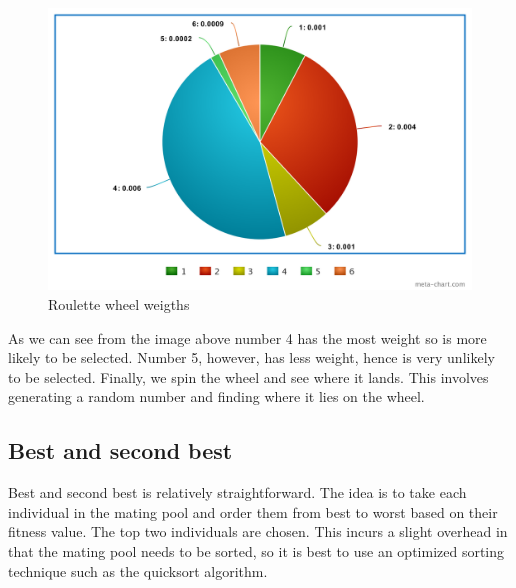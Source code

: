 \begin{figure}[h!]
\vspace{-5pt}
\centering
\includegraphics[width=1.0\textwidth]{images/roulette-wheel-2.png}
\caption{\label{fig:3col_graph}Roulette wheel weigths}
\end{figure}

As we can see from the image above number 4 has the most weight so is more likely to be selected. Number 5, however, has less weight, hence is very unlikely to be selected. Finally, we spin the wheel and see where it lands. This involves generating a random number and finding where it lies on the wheel.

\subsection{Best and second best}

Best and second best is relatively straightforward. The idea is to take each individual in the mating pool and order them from best to worst based on their fitness value. The top two individuals are chosen. This incurs a slight overhead in that the mating pool needs to be sorted, so it is best to use an optimized sorting technique such as the quicksort algorithm.